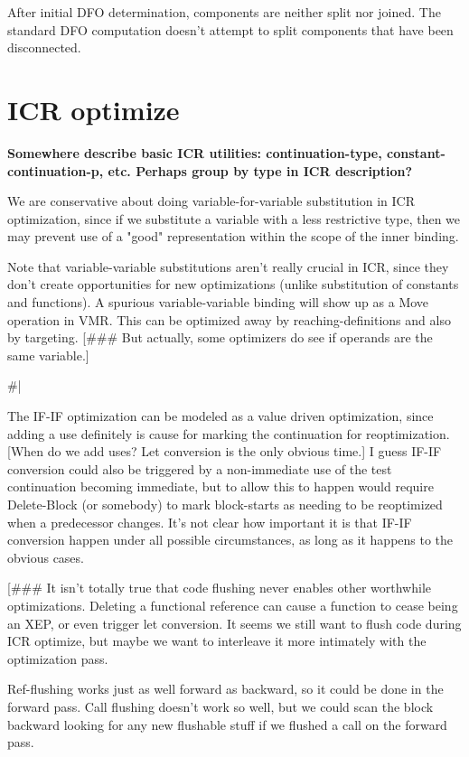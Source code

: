 After initial DFO determination, components are neither split nor joined.  The
standard DFO computation doesn't attempt to split components that have been
disconnected.


\chapter{ICR optimize}

{\bf Somewhere describe basic ICR utilities: continuation-type,
constant-continuation-p, etc.  Perhaps group by type in ICR description?}

We are conservative about doing variable-for-variable substitution in ICR
optimization, since if we substitute a variable with a less restrictive type,
then we may prevent use of a "good" representation within the scope of the
inner binding.

Note that variable-variable substitutions aren't really crucial in ICR, since
they don't create opportunities for new optimizations (unlike substitution of
constants and functions).  A spurious variable-variable binding will show up as
a Move operation in VMR.  This can be optimized away by reaching-definitions
and also by targeting.  [\#\#\# But actually, some optimizers do see if operands
are the same variable.]

\#|

The IF-IF optimization can be modeled as a value driven optimization, since
adding a use definitely is cause for marking the continuation for
reoptimization.  [When do we add uses?  Let conversion is the only obvious
time.]  I guess IF-IF conversion could also be triggered by a non-immediate use
of the test continuation becoming immediate, but to allow this to happen would
require Delete-Block (or somebody) to mark block-starts as needing to be
reoptimized when a predecessor changes.  It's not clear how important it is
that IF-IF conversion happen under all possible circumstances, as long as it
happens to the obvious cases.

[\#\#\# It isn't totally true that code flushing never enables other worthwhile
optimizations.  Deleting a functional reference can cause a function to cease
being an XEP, or even trigger let conversion.  It seems we still want to flush
code during ICR optimize, but maybe we want to interleave it more intimately
with the optimization pass.  

Ref-flushing works just as well forward as backward, so it could be done in the
forward pass.  Call flushing doesn't work so well, but we could scan the block
backward looking for any new flushable stuff if we flushed a call on the
forward pass.

